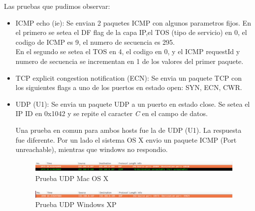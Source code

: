 \documentclass[a4paper]{article}
\begin{document}
Las pruebas que pudimos observar:

\begin{itemize}

\item ICMP echo (ie): Se envian 2 paquetes ICMP con algunos parametros fijos. En el primero se setea el DF flag de la capa IP,el TOS (tipo de servicio) en 0, el codigo de ICMP es 9, el numero de secuencia es 295.\\
En el segundo se setea el TOS en 4, el codigo en 0, y el ICMP requestId y numero de secuencia se incrementan en 1 de los valores del primer paquete.

\item TCP explicit congestion notification (ECN): Se envia un paquete TCP con los siguientes flags a uno de los puertos en estado open: SYN, ECN, CWR.

\item UDP (U1): Se envia un paquete UDP a un puerto en estado close. Se setea el IP ID en 0x1042 y se repite el caracter  \textit{C} en el campo de datos. 


Una prueba en comun para ambos hosts fue la de UDP (U1). La respuesta fue diferente. Por un lado el sistema OS X envio un paquete ICMP (Port unreachable), mientras que windows no respondio. 

\begin{figure}[H]
  \centering
  \includegraphics[scale=0.40]{graficos/macUdp.png}
  \caption{Prueba UDP Mac OS X}
\end{figure}  

\begin{figure}[H]
  \centering
  \includegraphics[scale=0.40]{graficos/windowsUdp.png}
  \caption{Prueba UDP Windows XP}
\end{figure} 
 
 

\end{itemize}
\end{document}
